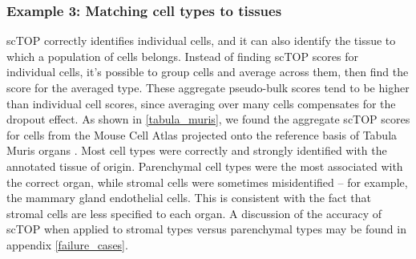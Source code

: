 \documentclass[aps,superscriptaddress, notitlepage,longbibliography]{revtex4-1}
\begin{document}
\subsubsection{Example 3: Matching cell types to tissues}

scTOP correctly identifies individual cells, and it can also identify the tissue to which a population of cells belongs. Instead of finding scTOP scores for individual cells, it's possible to group cells and average across them, then find the score for the averaged type. These aggregate pseudo-bulk scores tend to be higher than individual cell scores, since averaging over many cells compensates for the dropout effect. As shown in \ref{tabula_muris}, we found the aggregate scTOP scores for cells from the Mouse Cell Atlas projected onto the reference basis of Tabula Muris organs \cite{schaum_single-cell_2018}. Most cell types were correctly and strongly identified with the annotated tissue of origin. Parenchymal cell types were the most associated with the correct organ, while stromal cells were sometimes misidentified -- for example, the mammary gland endothelial cells. This is consistent with the fact that stromal cells are less specified to each organ. A discussion of the accuracy of scTOP when applied to stromal types versus parenchymal types may be found in appendix \ref{failure_cases}.
\end{document}
